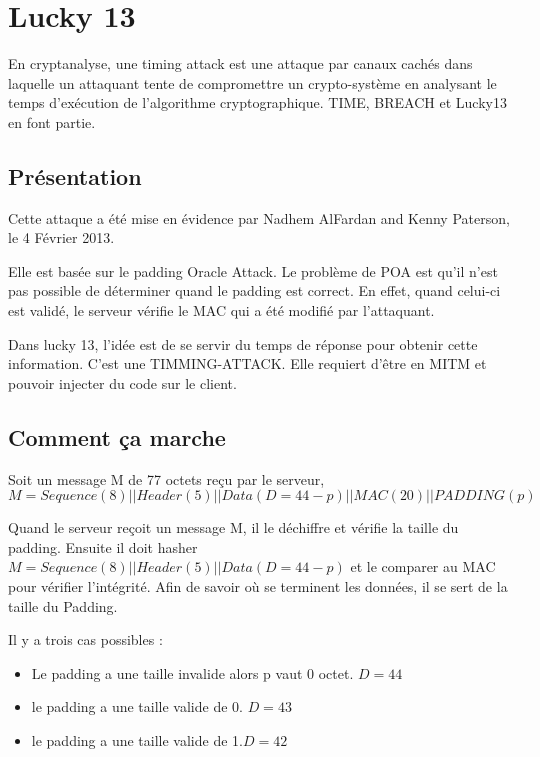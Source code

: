 \chapter{Lucky 13}
\label{chapter:luck}

En cryptanalyse, une timing attack est une attaque par canaux cachés dans laquelle 
un attaquant tente de compromettre un crypto-système en analysant le temps d'exécution 
de l'algorithme cryptographique. TIME, BREACH  et Lucky13 en font partie.

\section{Présentation}
\label{sec:pL13}

Cette attaque a été mise en évidence par Nadhem AlFardan and Kenny Paterson, le 4 Février 2013.

Elle est basée sur le padding Oracle Attack\up{\ref{chapter:poa}}. Le problème de POA est qu'il n'est pas possible de déterminer
quand le padding est correct. En effet, quand celui-ci est validé, le serveur vérifie le MAC qui a été modifié par l'attaquant.

Dans lucky 13, l'idée est de se servir du temps de réponse pour obtenir cette information. C'est une TIMMING-ATTACK.
Elle requiert d'être en MITM et pouvoir injecter du code sur le client.

\section{Comment ça marche}
\label{sec:ccmL13}

Soit un message M de 77 octets reçu par le serveur, \[ M = Sequence (8) || Header (5) || Data (D = 44 -p) || MAC (20) || PADDING (p) \]

Quand le serveur reçoit un message M, il le déchiffre et vérifie la taille du padding. 
Ensuite il doit hasher  $M = Sequence (8) || Header (5) || Data (D = 44 - p)$  et le comparer au MAC 
pour vérifier l'intégrité. Afin de savoir où se terminent les données, il se sert de la taille du Padding.

Il y a trois cas possibles : 
\begin{itemize}
\item Le padding a une taille invalide alors p vaut 0 octet. $D=44$
\item le padding a une taille valide de 0. $D=43$ 
\item le padding a une taille valide de 1.$D=42$
\end{itemize}


